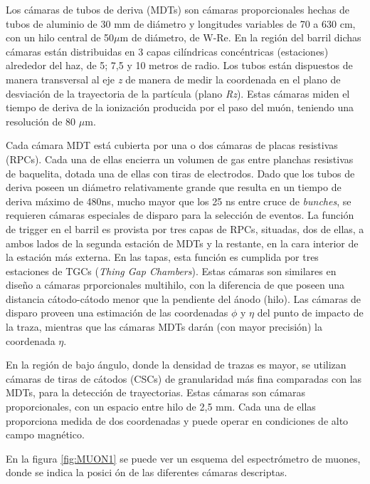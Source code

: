    Los c\'amaras de tubos de deriva (MDTs) son c\'amaras proporcionales hechas de tubos de aluminio de 30 mm de di\'ametro y longitudes variables de 70 a 630 cm, con un hilo central de 50$\mu$m de di\'ametro, de W-Re. En la regi\'on del barril dichas c\'amaras est\'an distribuidas en 3 capas cil\'indricas conc\'entricas (estaciones) alrededor del haz, de 5; 7,5 y 10 metros de radio. Los tubos est\'an dispuestos de manera transversal al eje \emph{z} de manera de medir la coordenada en el plano de desviaci\'on de la trayectoria de la part\'icula (plano \emph{Rz}).  Estas c\'amaras miden el tiempo de deriva de la ionizaci\'on producida por el paso del mu\'on, teniendo una resoluci\'on de 80 $\mu$m.
   
   Cada c\'amara MDT est\'a cubierta por una o dos c\'amaras de placas resistivas (RPCs). Cada una de ellas encierra un volumen de gas entre planchas resistivas de baquelita, dotada una de ellas con tiras de electrodos. Dado que los tubos de deriva poseen un di\'ametro relativamente grande que resulta en un tiempo de deriva m\'aximo de 480ns, mucho mayor que los 25 ns entre cruce de \emph{bunches}, se requieren c\'amaras especiales de disparo para la selecci\'on de eventos. La funci\'on de trigger en el barril es provista por tres capas de RPCs, situadas, dos de ellas, a ambos lados de la segunda estaci\'on de MDTs y la restante, en la cara interior de la estaci\'on m\'as externa. 
En las tapas, esta funci\'on es cumplida por tres estaciones de TGCs (\emph{Thing Gap Chambers}). Estas c\'amaras son similares en dise\~no a c\'amaras prporcionales multihilo, con la diferencia de que poseen una distancia c\'atodo-c\'atodo menor que la pendiente del \'anodo (hilo). 
   Las c\'amaras de disparo proveen una estimaci\'on de las coordenadas $\phi$ y $\eta$ del punto de impacto de la traza, mientras que las c\'amaras MDTs dar\'an (con mayor precisi\'on) la coordenada $\eta$.

    En la regi\'on de bajo \'angulo, donde la densidad de trazas es mayor, se utilizan c\'amaras de tiras de c\'atodos (CSCs) de granularidad m\'as fina comparadas con las MDTs, para la detecci\'on de trayectorias. Estas c\'amaras son c\'amaras proporcionales, con un espacio entre hilo de 2,5 mm. Cada una de ellas proporciona medida de dos coordenadas y puede operar en condiciones de alto campo magn\'etico.

   En la figura \ref{fig:MUON1} se puede ver un esquema del espectr\'ometro de muones, donde se indica la posici \'on de las diferentes c\'amaras descriptas.

